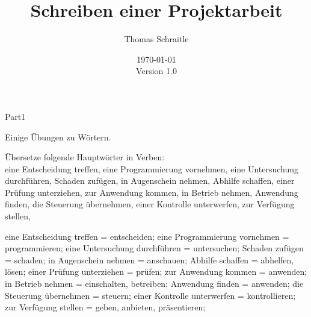 \documentclass[a4paper,twoside]{article}
\title{Schreiben einer Projektarbeit}
\author{Thomas Schraitle\\\email{toms@suse.de}}
\date{\today\\Version 1.0}
\begin{document}
\maketitle

\begin{exam}[Teil I.]{Part1}
\begin{instructions}[Wörter]
Einige Übungen zu Wörtern.
\end{instructions}

\begin{problem}[3]
Übersetze folgende Hauptwörter in Verben:\\
eine Entscheidung treffen, %
eine Programmierung vornehmen, %
eine Untersuchung durchführen, %
Schaden zufügen, %
in Augenschein nehmen, %
Abhilfe schaffen, %
einer Prüfung unterziehen, %
zur Anwendung kommen, %
in Betrieb nehmen, %
Anwendung finden, %
die Steuerung übernehmen, %
einer Kontrolle unterwerfen, %
zur Verfügung stellen, %
\begin{solution}
eine Entscheidung treffen = entscheiden;
eine Programmierung vornehmen = programmieren;
eine Untersuchung durchführen = untersuchen;
Schaden zufügen = schaden;
in Augenschein nehmen = anschauen;
Abhilfe schaffen = abhelfen, lösen;
einer Prüfung unterziehen = prüfen;
zur Anwendung kommen = anwenden;
in Betrieb nehmen = einschalten, betreiben;
Anwendung finden = anwenden;
die Steuerung übernehmen = steuern;
einer Kontrolle unterwerfen = kontrollieren;
zur Verfügung stellen = geben, anbieten, präsentieren;
\end{solution}
\end{problem}



\end{exam}
\end{document}
